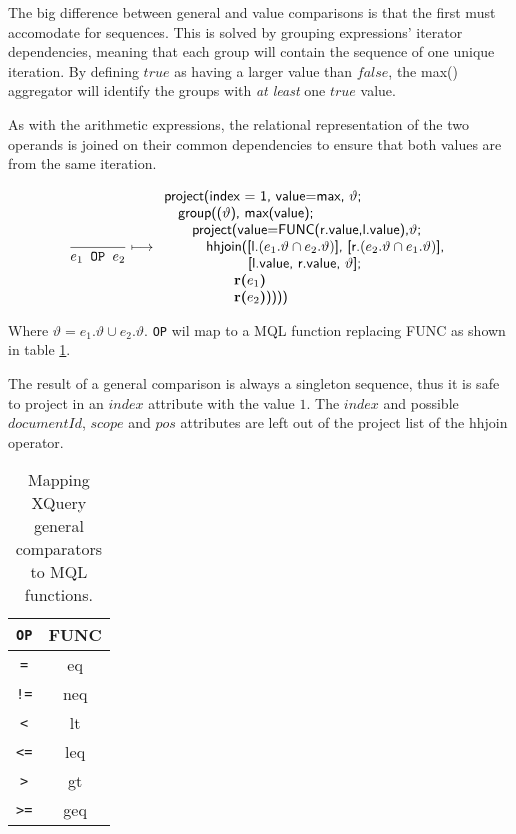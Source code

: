 The big difference between general and value comparisons is that the first must accomodate for sequences. This is
solved by grouping expressions' iterator dependencies, meaning that each group will contain the sequence of one
unique iteration. By defining $true$ as having a larger value than $false$, the \textsf{max()} aggregator will
identify the groups with \emph{at least} one $true$ value.

As with the arithmetic expressions, the relational representation of the two operands is joined on their common
dependencies to ensure that both values are from the same iteration.

\begin{equation}
\frac{}{e_1\mbox{\texttt{ OP }}e_2}\longmapsto
\begin{array}{l}
\mbox{\textsf{project(index = 1, value=max, }}\vartheta \textsf{;} \\ \quad
\mbox{\textsf{group((}}\vartheta\mbox{\textsf{), max(value);}} \\ \quad \quad
\mbox{\textsf{project(value=FUNC(r.value,l.value),}}\vartheta\mbox{\textsf{;}} \\ \quad \quad \quad
\mbox{\textsf{hhjoin([l.}}(e_1.\vartheta\cap e_2.\vartheta)\mbox{\textsf{], [r.}}(e_2.\vartheta\cap e_1.\vartheta)
\mbox{\textsf{],}} 
\\ \quad \quad \quad \quad \quad \quad\mbox{\textsf{[l.value, r.value, }}\vartheta\mbox{\textsf{];}} \\ \quad \quad
\quad \quad \quad \mbox{\textbf{r(}}e_1\mbox{\textbf{)}} \\ \quad \quad \quad \quad \quad
\mbox{\textbf{r(}}e_2\mbox{\textbf{)}\textsf{))))}}
\end{array}
\label{rule:trans:TD:comparative}
\end{equation}

Where $\vartheta = e_1.\vartheta \cup e_2.\vartheta$. \texttt{OP} wil map to a MQL function replacing
\textsf{FUNC} as shown in table \ref{tab:trans:TD:genCompMap}. 

The result of a general comparison is always a singleton sequence, thus it is safe to project in an $index$
attribute with the value $1$. The $index$ and possible $documentId$, $scope$ and $pos$ attributes are left out of
the project list of the \textsf{hhjoin} operator.

\begin{table}[h]
\centering
\begin{tabular}{c|c}
\texttt{OP} & \textsf{FUNC} \\ \hline
\texttt{=} & \textsf{eq} \\
\texttt{!=} & \textsf{neq} \\
\texttt{<} & \textsf{lt} \\
\texttt{<=} & \textsf{leq} \\
\texttt{>} & \textsf{gt} \\
\texttt{>=} & \textsf{geq} \\
\end{tabular}
\label{tab:trans:TD:genCompMap}
\caption{Mapping XQuery general comparators to MQL functions.}
\end{table}

